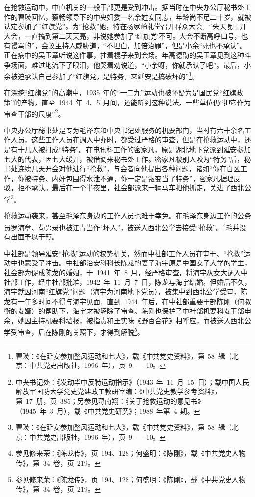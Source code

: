在抢救运动中，中直机关的一般干部更是受到冲击。据当时在中央办公厅秘书处工作的曹瑛回忆，蔡畅领导下的中央妇委一名余姓女同志，年龄尚不足二十岁，就被认定参加了“红旗党”。为“抢救”她，特在杨家岭礼堂召开群众大会，“头天晚上开大会，一直搞到第二天天亮，非说她参加了‘红旗党’不可。大会不断高呼口号，也有谩骂的”，会议主持人威胁道，“不坦白，加倍治罪”，但是小余“死也不承认”。正在病中的吴玉章听说这件事，拄着棍子来到会场。年高德劭的吴玉章见到这种斗争场面，难过地流下了眼泪，他哭着劝说道，“小余呀，你就承认了吧”。最后，小余被迫承认自己参加了“红旗党，是特务，来延安是搞破坏的”\footnote{曹瑛：《在延安参加整风运动和七大》，载《中共党史资料》，第~58~辑（北京：中共党史出版社，1996~年），页~9~—~10。}。

在深挖“红旗党”的高潮中，1935~年的“一二九”运动也被怀疑为是国民党“红旗政策”的产物，直至~1944~年~4、5~月间，还能听到这种说法，一些单位仍“把它作为审查干部的尺度”\footnote{中央书记处：《发动华中反特运动指示》（1943~年~11~月~15~日）；载中国人民解放军国防大学党史党建政工教研室编：《中共党史教学参考资料》，第~17~册，页~385；另参见蒋南翔：《关于抢救运动的意见书》（1945~年~3~月），载《中共党史研究》；1988~年第~4~期。}。

中央办公厅秘书处是专为毛泽东和中央书记处服务的机要部门，当时有六十余名工作人员，这些工作人员在调入中办时，都受过严格的审查，但是在抢救运动中，还是有十几人被打成“特务”。在电讯科工作的密家凡，原是湖北地下党派到延安参加七大的代表，因七大缓开，被借调来秘书处工作。密家凡被别人咬为“特务”后，秘书处连续几天开会对他进行“抢救”，与会者向他提出各种问题，诸如“你在白区工作，你被特务、内奸包围得水泄不通，你一定是叛变当了特务”，密家凡据理反驳，拒不承认。最后在一个半夜里，社会部派来一辆马车把他抓走，关进了西北公学\footnote{曹瑛：《在延安参加整风运动和七大》，载《中共党史资料》，第~58~辑（北京：中共党史出版社，1996~年），页~9~—~10。}。

抢救运动袭来，甚至毛泽东身边的工作人员也难于幸免。在毛泽东身边工作的公务员罗海章、苟兴录也被江青当作“坏人”，被送入西北公学去接受“抢救”。\footnote{参见修来荣：《陈龙传》，页~194、128；何盛明：《陈刚》，载《中共党史人物传》，第~34~卷，页~219。}毛并没有出面予以干预。

中社部是领导延安“抢救”运动的权势机关，然而中社部工作人员在审干、“抢救”运动中也蒙受了冲击。中社部治安科科长陈龙的妻子海宇原是中国女子大学的学生，社会部为促成陈龙的婚姻，于~1941~年~8~月，经严格审查，将海宇从女大调入中社部工作，经中杜部批准，1942~年~11~月~7~日，陈龙与海宇结婚。但婚后不久，海宇就因河南“红旗党”问题（海宇为河南地下党员），被集中到西北公学受审，陈龙有一年多时间不得与海宇见面，直到~1944~年后，在中社部重要干部陈刚（何叔衡的女婿）的帮助下，海宇才被解除了审查。陈刚也保护了中社部机要科女干部申余，她因主持机要科墙报，被指责和王实味《野百合花》相呼应，而被送入西北公学受审查，后在陈刚的关照下，才得到解脱\footnote{参见修来荣：《陈龙传》，页~194、128；何盛明：《陈刚》，载《中共党史人物传》，第~34~卷，页~219。}。

